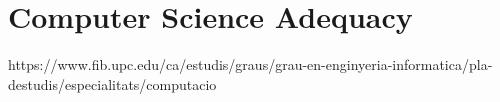 \chapter{Computer Science Adequacy}

\label{Chapter4} 

https://www.fib.upc.edu/ca/estudis/graus/grau-en-enginyeria-informatica/pla-destudis/especialitats/computacio\\


